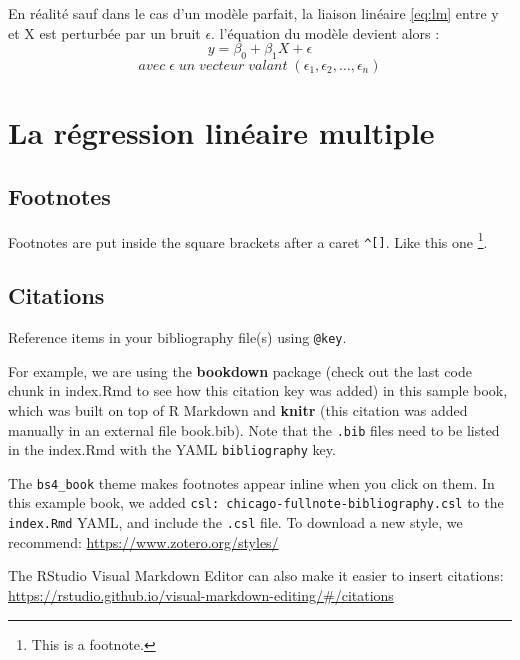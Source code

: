 \documentclass[
]{book}
\theoremstyle{definition}
\theoremstyle{definition}
\theoremstyle{definition}
\theoremstyle{definition}
\theoremstyle{remark}
\begin{document}
En réalité sauf dans le cas d'un modèle parfait, la liaison linéaire \eqref{eq:lm} entre y et X est perturbée par un bruit \(\epsilon\). l'équation du modèle devient alors :\\
\begin{equation}
y = \beta_0 + \beta_1 X +\epsilon
\label{eq:lm-simple}
\end{equation}
\[avec\; \epsilon\; un\; vecteur\; valant\; (\epsilon_1,\epsilon_2,\dots,\epsilon_n)\]

\hypertarget{multiple-lm}{%
\chapter{La régression linéaire multiple}\label{multiple-lm}}

\hypertarget{footnotes}{%
\section{Footnotes}\label{footnotes}}

Footnotes are put inside the square brackets after a caret \texttt{\^{}{[}{]}}. Like this one \footnote{This is a footnote.}.

\hypertarget{citations}{%
\section{Citations}\label{citations}}

Reference items in your bibliography file(s) using \texttt{@key}.

For example, we are using the \textbf{bookdown} package \citep{R-bookdown} (check out the last code chunk in index.Rmd to see how this citation key was added) in this sample book, which was built on top of R Markdown and \textbf{knitr} \citep{xie2015} (this citation was added manually in an external file book.bib).
Note that the \texttt{.bib} files need to be listed in the index.Rmd with the YAML \texttt{bibliography} key.

The \texttt{bs4\_book} theme makes footnotes appear inline when you click on them. In this example book, we added \texttt{csl:\ chicago-fullnote-bibliography.csl} to the \texttt{index.Rmd} YAML, and include the \texttt{.csl} file. To download a new style, we recommend: \url{https://www.zotero.org/styles/}

The RStudio Visual Markdown Editor can also make it easier to insert citations: \url{https://rstudio.github.io/visual-markdown-editing/\#/citations}
\end{document}
